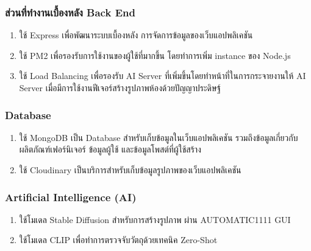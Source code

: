 \documentclass[12pt,oneside,openright,a4paper]{cpe-thai-project}
\begin{document}
\subsubsection{ส่วนที่ทำงานเบื้องหลัง Back End}
\begin{enumerate}
  \item ใช้ Express เพื่อพัฒนาระบบเบื้องหลัง การจัดการข้อมูลของเว็บแอปพลิเคชัน
  \item ใช้ PM2 เพื่อรองรับการใช้งานของผู้ใช้ที่มากขึ้น โดยทำการเพิ่ม instance ของ Node.js
  \item ใช้ Load Balancing เพื่อรองรับ AI Server ที่เพิ่มขึ้นโดยทำหน้าที่ในการกระจายงานให้ AI Server เมื่อมีการใช้งานฟีเจอร์สร้างรูปภาพห้องด้วยปัญญาประดิษฐ์
\end{enumerate}

\subsubsection{Database}
\begin{enumerate}
  \item ใช้ MongoDB เป็น Database สำหรับเก็บข้อมูลในเว็บแอปพลิเคชัน รวมถึงข้อมูลเกี่ยวกับผลิตภัณฑ์เฟอร์นิเจอร์ ข้อมูลผู้ใช้ และข้อมูลโพสต์ที่ผู้ใช้สร้าง
  \item ใช้ Cloudinary เป็นบริการสำหรับเก็บข้อมูลรูปภาพของเว็บแอปพลิเคชัน
\end{enumerate}

\subsubsection{Artificial Intelligence (AI)}
\begin{enumerate}
  \item ใช้โมเดล Stable Diffusion สำหรับการสร้างรูปภาพ ผ่าน AUTOMATIC1111 GUI
  \item ใช้โมเดล CLIP เพื่อทำการตรวจจับวัตถุด้วยเทคนิค Zero-Shot
\end{enumerate}
\end{document}
